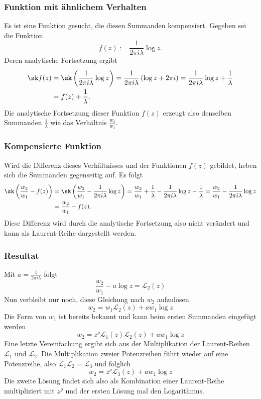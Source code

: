 \subsubsection{Funktion mit ähnlichem Verhalten}
Es ist eine Funktion gesucht, die diesen Summanden kompensiert. 
Gegeben sei die Funktion
\[f(z) := \frac{1}{2\pi i\lambda} \log z.\]
Deren analytische Fortsetzung ergibt
\begin{align*} 
\sk f(z) 
&= \sk \left(\frac{1}{2\pi i\lambda} \log z \right) 
= \frac{1}{2\pi i\lambda} \left(\log z + 2\pi i\right) 
=\frac{1}{2\pi i\lambda} \log z+  \frac{1}{\lambda} \\
&= f(z) + \frac{1}{\lambda}.
\end{align*}
Die analytische Fortsetzung dieser Funktion $f(z)$ erzeugt also denselben Summanden $\frac{1}{\lambda}$ wie das Verhältnis $\frac{w_2}{w_1}$.

\subsubsection{Kompensierte Funktion}
Wird die Differenz dieses Verhältnisses und der Funktionen $f(z)$ gebildet, heben sich die Summanden gegenseitig auf. 
Es folgt
\begin{align*} 
\sk\left( \frac{w_2}{w_1} - f(z) \right)
&=\sk\left( \frac{w_2}{w_1} - \frac{1}{2\pi i\lambda} \log z \right)
= \frac{w_2}{w_1} +\frac{1}{\lambda} - \frac{1}{2\pi i\lambda} \log z - \frac{1}{\lambda} 
=\frac{w_2}{w_1} - \frac{1}{2\pi i\lambda} \log z\\
&= \frac{w_2}{w_1} - f(z).
\end{align*}
Diese Differenz wird durch die analytische Fortsetzung also nicht verändert und kann als Laurent-Reihe dargestellt werden. 

\subsubsection{Resultat}

Mit $a = \frac{1}{2\pi i\lambda}$ folgt
\[\frac{w_2}{w_1} - a\log z =\mathcal{L}_2(z)\]
Nun verbleibt nur noch, diese Gleichung nach $w_2$ aufzulösen. 
\[ w_2 = w_1 \mathcal{L}_2(z) + a w_1 \log z \]
Die Form von $w_1$ ist bereits bekannt und kann beim ersten Summanden eingefügt werden
\[ w_2 = z^\varrho\mathcal{L}_1(z)\mathcal{L}_2(z) + a w_1 \log z \]
Eine letzte Vereinfachung ergibt sich aus der Multiplikation der Laurent-Reihen $\mathcal{L}_1$ und $\mathcal{L}_2$. 
Die Multiplikation zweier Potenzreihen führt wieder auf eine Potenzreihe, also $\mathcal{L}_1 \mathcal{L}_2=\mathcal{L}_3$ und folglich
\[w_2 = z^\varrho\mathcal{L}_3(z) + a w_1 \log z\]
Die zweite Lösung findet sich also als Kombination einer Laurent-Reihe multipliziert mit $z^\varrho$ und der ersten Lösung mal den Logarithmus.

